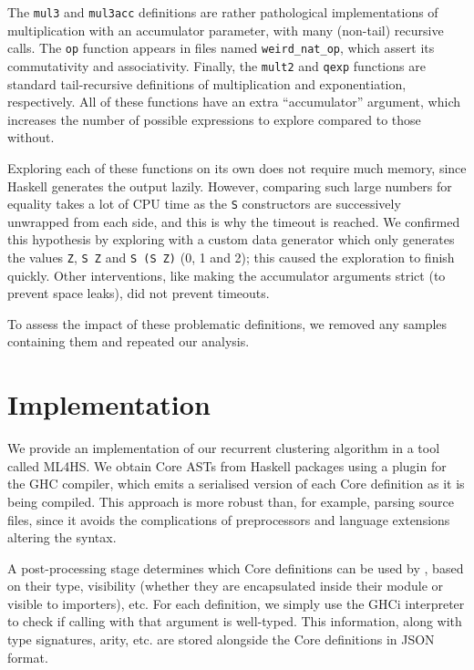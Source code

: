 The \texttt{mul3} and \texttt{mul3acc} definitions are rather pathological
implementations of multiplication with an accumulator parameter, with many
(non-tail) recursive calls. The \texttt{op} function appears in files named
\texttt{weird\_nat\_op}, which assert its commutativity and associativity.
Finally, the \texttt{mult2} and \texttt{qexp} functions are standard
tail-recursive definitions of multiplication and exponentiation, respectively.
All of these functions have an extra ``accumulator'' argument, which increases
the number of possible expressions to explore compared to those without.

Exploring each of these functions on its own does not require much memory, since
Haskell generates the output lazily. However, comparing such large numbers for
equality takes a lot of CPU time as the \texttt{S} constructors are successively
unwrapped from each side, and this is why the timeout is reached. We confirmed
this hypothesis by exploring with a custom data generator which only generates
the values \texttt{Z}, \texttt{S Z} and \texttt{S (S Z)} (0, 1 and 2); this
caused the exploration to finish quickly. Other interventions, like making the
accumulator arguments strict (to prevent space leaks), did not prevent timeouts.

To assess the impact of these problematic definitions, we removed any samples
containing them and repeated our analysis.

\section{Implementation}
\label{sec:implementation}

We provide an implementation of our recurrent clustering algorithm in a tool
called \textsc{ML4HS}. We obtain Core ASTs from Haskell packages using a plugin
for the GHC compiler, which emits a serialised version of each Core definition
as it is being compiled. This approach is more robust than, for example, parsing
source files, since it avoids the complications of preprocessors and language
extensions altering the syntax.

A post-processing stage determines which Core definitions can be used by
\qspec{}, based on their type, visibility (whether they are encapsulated inside
their module or visible to importers), etc. For each definition, we simply use
the GHCi interpreter to check if calling \qspec{} with that argument is
well-typed. This information, along with type signatures, arity, etc. are stored
alongside the Core definitions in JSON format.

